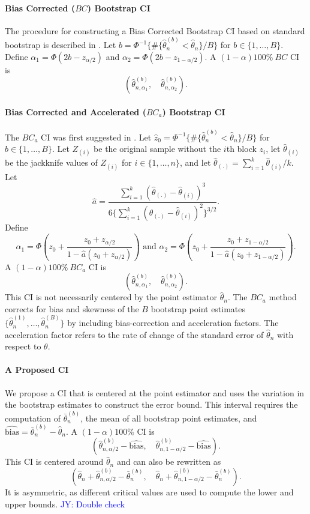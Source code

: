 \documentclass[12pt, letterpaper, titlepage]{article}
\newcommand{\jy}[1]{\textcolor{blue}{JY: #1}}
\begin{document}
\paragraph{Bias Corrected ($BC$) Bootstrap CI}
The procedure for constructing a Bias Corrected Bootstrap CI based on standard
bootstrap is described in \citet{carpenter2000bootstrap}.
Let $b = \Phi^{-1}\{\#\{\hat\theta_n^{(b)} < \hat{\theta}_n\} / B\}$
for $b \in \{1, \ldots, B\}$. Define
$\alpha_1 = \Phi(2b - z_{\alpha/2})$ and 
$\alpha_2 = \Phi(2b - z_{1 - \alpha/2})$.
A $(1 - \alpha)100\%~BC$ CI is
\[
(\hat\theta_{n, \alpha_1}^{(b)}, \quad \hat\theta_{n, \alpha_2}^{(b)}).
\]


\paragraph{Bias Corrected and Accelerated ($BC_a$) Bootstrap CI}
The $BC_a$ CI was first suggested in \citet{efron1987better}.
Let $\hat{z}_0 = \Phi^{-1}\{\#\{\hat\theta_n^{(b)} < \hat{\theta}_n\} / B\}$
for $b \in \{1, \ldots, B\}$. 
Let $Z_{(i)}$ be the original sample without the $i$th block $z_i$, let
$\hat{\theta}_{(i)}$ be the jackknife values of $Z_{(i)}$
for $i \in \{1, \ldots, n\}$, 
and let $\hat{\theta}_{(.)} = \sum_{i=1}^{k} \hat{\theta}_{(i)} / k$. 
Let 
\[
\hat{a} = \frac{\sum_{i=1}^{k} (\hat{\theta}_{(.)} -
  \hat{\theta}_{(i)})^3}{6\{\sum_{i=1}^{k} (\hat{\theta}_{(.)} -
  \hat{\theta}_{(i)})^2\}^{3/2}}.
\]
Define
\[
\alpha_1 = \Phi\left(z_0 + \frac{z_{0} +
  z_{\alpha/2}}{1 - \hat{a}(z_{0} + z_{\alpha/2})}\right)
\text{ and }
\alpha_2 = \Phi\left(z_0 + \frac{z_{0} +
  z_{1 - \alpha/2}}{1 - \hat{a}(z_{0} + z_{1 - \alpha/2})}\right).
\]
A $(1 - \alpha)100\%~BC_a$ CI is
\[
(\hat\theta_{n, \alpha_1}^{(b)}, \quad \hat\theta_{n, \alpha_2}^{(b)}).
\]
This CI is not necessarily centered by the point estimator $\hat\theta_n$. The
$BC_a$ method corrects for bias and skewness of the $B$ bootstrap point
estimates $\{\hat\theta_n^{(1)}, \ldots, \hat\theta_n^{(B)}\}$ by including
bias-correction and acceleration factors. The acceleration factor refers to
the 
rate of change of the standard error of $\hat\theta_n$ with respect to
$\theta$.



\paragraph{A Proposed CI}
We propose a CI that is centered at the point estimator and uses the variation
in the bootstrap estimates to construct the error bound. This interval requires
the computation of $\bar\theta_n^{(b)}$, the mean of all bootstrap point
estimates, and $\widehat{\text{bias}} = \bar\theta_n^{(b)} - \hat\theta_n$.
A $(1 - \alpha)100\%$ CI is
\[
(\hat\theta_{n, \alpha/2}^{(b)} - \widehat{\text{bias}}, \quad
\hat\theta_{n, 1 - \alpha/2}^{(b)} - \widehat{\text{bias}}).
\]
This CI is centered around $\hat\theta_n$ and can also be rewritten
as 
\[
(\hat\theta_n + \hat\theta_{n, \alpha/2}^{(b)} - \bar\theta_n^{(b)}, \quad
\hat\theta_n + \hat\theta_{n, 1 - \alpha/2}^{(b)} - \bar\theta_n^{(b)}).
\]
It is asymmetric, as different critical values are used to compute
the lower and upper bounds.
\jy{Double check}
\end{document}
